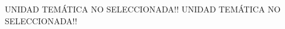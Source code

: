 \documentclass[12pt]{article}
\newcommand{\unidadtem}{1}
\begin{document}
\ifcase%
    \unidadtem{} UNIDAD TEMÁTICA NO SELECCIONADA!!
    \or 
    \or 
    \or 
    \or 
    \or 
    \or 
    \or 
    \or 
    \else UNIDAD TEMÁTICA NO SELECCIONADA!!
\fi

\printbibliography
{}
\end{document}
